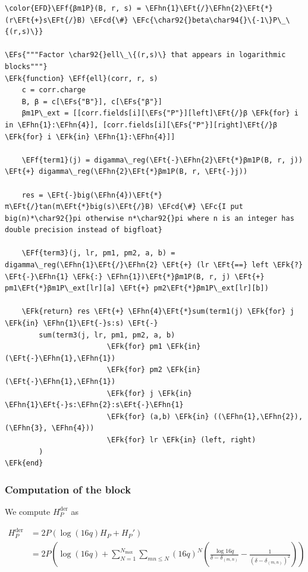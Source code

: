 \documentclass[a4paper]{article}
\numberwithin{equation}{section}
\newcommand{\EFc}[1]{\textcolor{EFc}{#1}} %
\newcommand{\EFcd}[1]{\textcolor{EFcd}{#1}} %
\newcommand{\EFs}[1]{\textcolor{EFs}{#1}} %
\newcommand{\EFk}[1]{\textcolor{EFk}{#1}} %
\newcommand{\EFf}[1]{\textcolor{EFf}{#1}} %
\newcommand{\EFt}[1]{\textcolor{EFt}{#1}} %
\newcommand{\EFhn}[1]{\textcolor{EFhn}{#1}} %
\begin{document}
\begin{Code}
\begin{Verbatim}
\color{EFD}\EFf{βm1P}(B, r, s) = \EFhn{1}\EFt{/}\EFhn{2}\EFt{*}(r\EFt{+}s\EFt{/}B) \EFcd{\#} \EFc{\char92{}beta\char94{}\{-1\}P\_\{(r,s)\}}

\EFs{"""Factor \char92{}ell\_\{(r,s)\} that appears in logarithmic blocks"""}
\EFk{function} \EFf{ell}(corr, r, s)
    c = corr.charge
    B, β = c[\EFs{"B"}], c[\EFs{"β"}]
    βm1P\_ext = [[corr.fields[i][\EFs{"P"}][left]\EFt{/}β \EFk{for} i in \EFhn{1}:\EFhn{4}], [corr.fields[i][\EFs{"P"}][right]\EFt{/}β \EFk{for} i \EFk{in} \EFhn{1}:\EFhn{4}]]

    \EFf{term1}(j) = digamma\_reg(\EFt{-}\EFhn{2}\EFt{*}βm1P(B, r, j)) \EFt{+} digamma\_reg(\EFhn{2}\EFt{*}βm1P(B, r, \EFt{-}j))

    res = \EFt{-}big(\EFhn{4})\EFt{*}π\EFt{/}tan(π\EFt{*}big(s)\EFt{/}B) \EFcd{\#} \EFc{I put big(n)*\char92{}pi otherwise n*\char92{}pi where n is an integer has double precision instead of bigfloat}

    \EFf{term3}(j, lr, pm1, pm2, a, b) = digamma\_reg(\EFhn{1}\EFt{/}\EFhn{2} \EFt{+} (lr \EFt{==} left \EFk{?} \EFt{-}\EFhn{1} \EFk{:} \EFhn{1})\EFt{*}βm1P(B, r, j) \EFt{+} pm1\EFt{*}βm1P\_ext[lr][a] \EFt{+} pm2\EFt{*}βm1P\_ext[lr][b])

    \EFk{return} res \EFt{+} \EFhn{4}\EFt{*}sum(term1(j) \EFk{for} j \EFk{in} \EFhn{1}\EFt{-}s:s) \EFt{-}
        sum(term3(j, lr, pm1, pm2, a, b)
                        \EFk{for} pm1 \EFk{in} (\EFt{-}\EFhn{1},\EFhn{1})
                        \EFk{for} pm2 \EFk{in} (\EFt{-}\EFhn{1},\EFhn{1})
                        \EFk{for} j \EFk{in} \EFhn{1}\EFt{-}s:\EFhn{2}:s\EFt{-}\EFhn{1}
                        \EFk{for} (a,b) \EFk{in} ((\EFhn{1},\EFhn{2}), (\EFhn{3}, \EFhn{4}))
                        \EFk{for} lr \EFk{in} (left, right)
        )
\EFk{end}
\end{Verbatim}
\end{Code}
\subsubsection*{Computation of the block}
\label{sec:orgec564b0}

We compute \(H^{\text{der}}_{P}\) as

\begin{align}
H_{P}^{\text{der}} &= 2P(\log(16q) H_{P} + H_{P}') \\
                     &= 2P \left(   \log(16q) + \sum_{N=1}^{N_{\text{max}}} \sum_{mn \leq N} (16q)^{N} \left(\frac{\log 16q}{\delta - \delta_{(m,n)}} - \frac{1}{(\delta - \delta_{(m,n)})^{2}} \right)\right)
\end{align}
\end{document}
